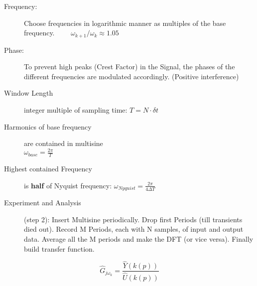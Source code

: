 \begin{tcolorbox}[colback=brown!5!white,colframe=brown!75!black,title=\textbf{Optimising Multisine for optimal crest factor}]
\begin{description}
\item[Frequency:] Choose frequencies in logarithmic manner as multiples of the base frequency. $\qquad \omega_{k+1}/\omega_{k} \approx 1.05$
\item[Phase:] To prevent high peaks (Crest Factor) in the Signal, the phases of the different frequencies are modulated accordingly. (Positive interference)
\end{description}
\end{tcolorbox}

\begin{tcolorbox}[colback=brown!5!white,colframe=brown!75!black,title=\textbf{Multisine Identification Implementation procedure}]
\begin{description}
\item[Window Length] integer multiple of sampling time:  \( T = N \cdot \delta t\)
\item[Harmonics of base frequency] are contained in multisine \\ \( {\omega}_{base} = \frac{2 \pi}{T}\)
\item[Highest contained Frequency] is \textbf{half} of Nyquist frequency: \( {\omega}_{Nyquist}  = \frac{2 \pi}{4 \Delta T}\)

\item[Experiment and Analysis] (step 2): Insert Multisine periodically. Drop first Periods (till transients died out). Record M Periods, each with N samples, of input and output data. Average all the M periods and make the DFT (or vice versa). Finally build transfer function.
\end{description}

\begin{equation*}
{\hat{G} _{j{\omega}_{k}}}=\frac{\hat{Y}(k(p))}{\hat{U}(k(p))}
\end{equation*}
\end{tcolorbox}




